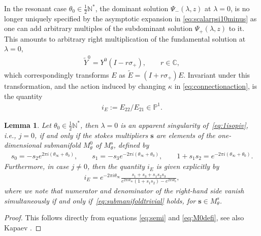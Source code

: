 \documentclass[pdftex]{sigma}
\numberwithin{equation}{section}
\newtheorem{lem}[thm]{Lemma}
\begin{document}
In the resonant case $\theta_0\in \tfrac{1}{2}\mathbb{N}^*$, the dominant solution
$\Psi_-(\lambda,z)$ at $\lambda=0$, is no longer uniquely specif\/ied by the asymptotic expansion in
\eqref{eq:scalarpsi10minus} as one can add arbitrary multiples of the subdominant solution $\Psi_+(\lambda,z)$ to it.
This amounts to arbitrary right multiplication of the fundamental solution at $\lambda=0$,
\begin{gather*}
\widetilde{Y}^0=Y^0(I-r\sigma_+),\qquad r\in\mathbb{C},
\end{gather*}
which correspondingly transforms $E$ as $\widetilde{E}=(I+r\sigma_+)E$. Invariant under this transformation, and the action induced by changing $\kappa$ in \eqref{eq:connectionaction}, is the quantity
\begin{gather}\label{eq:iEdefi}
i_E:=E_{22}/E_{21}\in\mathbb{P}^1.
\end{gather}
\begin{lem} \label{lem:trivialmon}
	Let $\theta_0\in\tfrac{1}{2}\mathbb{N}^*$, then $\lambda=0$ is an apparent singularity of~\eqref{eq:1isopiv}, i.e., $j=0$, if and only if the stokes multipliers $\mathbf{s}$ are elements of the one-dimensional submanifold $M_\theta^0$ of $M_\theta^s$, defined by
	\begin{gather}\label{eq:submanifoldtrivial}
	s_0=-s_2 e^{2\pi i (\theta_\infty+\theta_0)}, \qquad s_1=-s_3 e^{-2\pi i (\theta_\infty+\theta_0)}, \qquad 1+s_1s_2= e^{-2\pi i (\theta_\infty+\theta_0)}.
	\end{gather}
	Furthermore, in case $j\neq 0$, then the quantity $i_E$ is given explicitly by
	\begin{gather*}
	i_E=e^{-2 \pi i \theta_\infty}\frac{s_1+s_3+s_1s_2s_3}{e^{2 \pi i \theta_\infty}(1+s_1s_2)-e^{2 \pi i \theta_0}},
	\end{gather*}	
	where we note that numerator and denominator of the right-hand side vanish simultaneously if and only if~\eqref{eq:submanifoldtrivial} holds, for $\mathbf{s}\in M_\theta^s$.
\end{lem}
\begin{proof}
	This follows directly from equations \eqref{eq:semi} and \eqref{eq:M0defi}, see also Kapaev \cite{kapaev1998}.
\end{proof}
\end{document}
